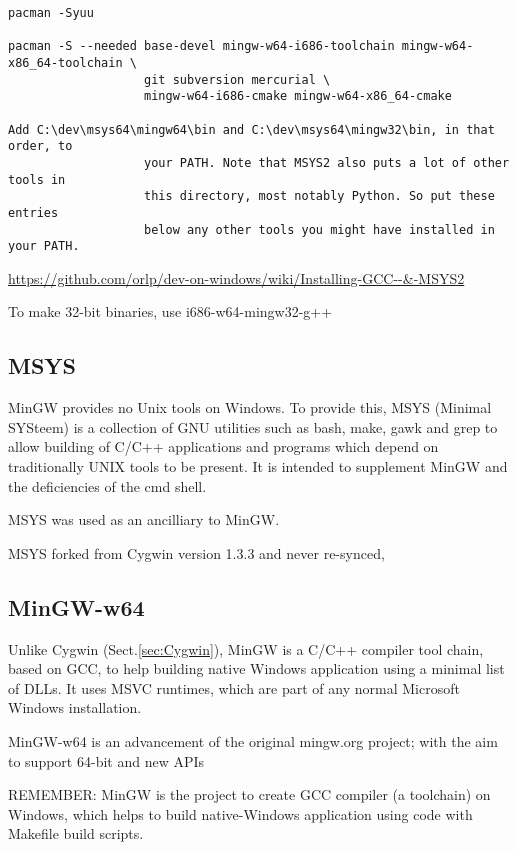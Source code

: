 \begin{verbatim}
pacman -Syuu

pacman -S --needed base-devel mingw-w64-i686-toolchain mingw-w64-x86_64-toolchain \
                   git subversion mercurial \
                   mingw-w64-i686-cmake mingw-w64-x86_64-cmake
                   
Add C:\dev\msys64\mingw64\bin and C:\dev\msys64\mingw32\bin, in that order, to
                   your PATH. Note that MSYS2 also puts a lot of other tools in
                   this directory, most notably Python. So put these entries
                   below any other tools you might have installed in your PATH.   
\end{verbatim}
\url{https://github.com/orlp/dev-on-windows/wiki/Installing-GCC--&-MSYS2}

To make 32-bit binaries, use i686-w64-mingw32-g++
 
\subsection{MSYS}
\label{sec:MSYS}

MinGW provides no Unix tools on Windows.
To provide this, MSYS (Minimal SYSteem) is a collection of GNU utilities such as
bash, make, gawk and grep to allow building of C/C++ applications and programs
which depend on traditionally UNIX tools to be present. It is intended to
supplement MinGW and the deficiencies of the cmd shell.

MSYS was used as an ancilliary to MinGW. 

MSYS forked from Cygwin version 1.3.3 and never re-synced, 


\subsection{MinGW-w64}
\label{sec:MinGW-w64}

Unlike Cygwin (Sect.\ref{sec:Cygwin}), MinGW is a C/C++ compiler tool chain,
based on GCC, to help building native Windows application using a minimal list
of DLLs. It uses MSVC runtimes, which are part of any normal Microsoft Windows
installation.

MinGW-w64 is an advancement of the original mingw.org project;
with the aim to support 64-bit and new APIs

REMEMBER: MinGW is the project to create GCC compiler (a toolchain) on Windows,
which helps to build native-Windows application using code with Makefile build
scripts.



